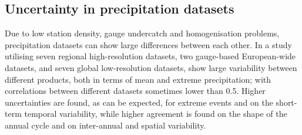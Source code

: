 \subsection{Uncertainty in precipitation datasets}\label{sec:uncertainty_pr}
Due to low station density, gauge undercatch and homogenisation problems, precipitation datasets can show large differences between each other. In a study utilising seven regional high-resolution datasets, two gauge-based European-wide datasets, and seven global low-resolution datasets, \citet{Prein2017} show large variability between different products, both in terms of mean and extreme precipitation; with correlations between different datasets sometimes lower than 0.5. Higher uncertainties are found, as can be expected, for extreme events and on the short-term temporal variability, while higher agreement is found on the shape of the annual cycle and on inter-annual and spatial variability.

